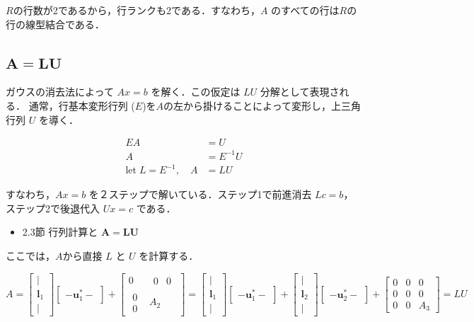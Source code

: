 \documentclass[letterpaper]{article}
\begin{document}
$R$の行数が2であるから，行ランクも2である．すなわち，$A$ のすべての行は$R$の行の線型結合である．

\clearpage

\subsection{$\boldsymbol{A=LU}$}

ガウスの消去法によって $Ax=b$ を解く．この仮定は $LU$ 分解として表現される．
通常，行基本変形行列 ($E$)を$A$の左から掛けることによって変形し，上三角行列 $U$ を導く．

\begin{align*}
  EA &= U\\
  A &= E^{-1}U\\
\text{let} \; L = E^{-1}, \quad  A &= LU
\end{align*}

すなわち，$Ax=b$ を２ステップで解いている．ステップ1で前進消去 $Lc=b$，ステップ2で後退代入 $Ux=c$ である．

\begin{itemize}
  \item 2.3節 行列計算と $\bm{A=LU}$
\end{itemize}

ここでは，$A$から直接 $L$ と $U$ を計算する．

\begin{equation*}
  A = 
      \begin{bmatrix}
        |\\
        \bm{l}_1\\
        |
      \end{bmatrix}
      \begin{bmatrix}
        -  \bm{u}^*_1  -
      \end{bmatrix}
  +  \begin{bmatrix}
      0 & \begin{matrix} 0 & 0 \end{matrix}\\
      \begin{matrix} 0 \\ 0 \end{matrix} & A_2
    \end{bmatrix}
  = 
  \begin{bmatrix}
    |\\
    \bm{l}_1\\
    |
  \end{bmatrix}
  \begin{bmatrix}
    - \bm{u}^*_1 -
  \end{bmatrix}
  +
  \begin{bmatrix}
    |\\
    \bm{l}_2\\
    |
  \end{bmatrix}
  \begin{bmatrix}
    - \bm{u}^*_2  -
  \end{bmatrix}
  +  \begin{bmatrix}
  0 & 0 & 0\\
  0 & 0 & 0 \\
  0 & 0 & A_3
  \end{bmatrix} = LU
\end{equation*}
 
\end{document}
